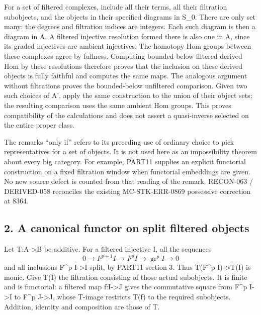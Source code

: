 \documentclass[11pt]{article}
\begin{document}
For a set of filtered complexes,\allowbreak{} include all their terms,\allowbreak{} all their filtration subobjects,\allowbreak{} and the objects in their specified diagrams in S\_\allowbreak{}0. There are only set many:\allowbreak{} the degrees and filtration indices are integers. Each such diagram is then a diagram in A\textquotesingle. A filtered injective resolution formed there is also one in A,\allowbreak{} since its graded injectives are ambient injectives. The homotopy Hom groups between these complexes agree by fullness. Computing bounded-below filtered derived Hom by these resolutions therefore proves that the inclusion on these derived objects is fully faithful and computes the same maps. The analogous argument without filtrations proves the bounded-below unfiltered comparison. Given two such choices of A',\allowbreak{} apply the same construction to the union of their object sets; the resulting comparison uses the same ambient Hom groups. This proves compatibility of the calculations and does not assert a quasi-inverse selected on the entire proper class.

The remark\textquotesingle s ``only if'' refers to its preceding use of ordinary choice to pick representatives for a set of objects. It is not used here as an impossibility theorem about every big category. For example,\allowbreak{} PART11 supplies an explicit functorial construction on a fixed filtration window when functorial embeddings are given. No new source defect is counted from that reading of the remark. RECON-063 /\allowbreak{} DERIVED-058 reconciles the existing MC-STK-ERR-0869 possessive correction at 8364.

\subsection{2. A canonical functor on split filtered objects}\label{proofs-8352-8772-a-canonical-functor-on-split-filtered-objects}

Let T:\allowbreak{}A\allowbreak{}->B be additive. For a filtered injective I,\allowbreak{} all the sequences \[
 0\to F^{p+1}I\longrightarrow F^p I
      \longrightarrow \operatorname{gr}^p I\to0              \tag{2.1}
\] and all inclusions F\^{}p I\allowbreak{}->I split,\allowbreak{} by PART11 section 3. Thus T(F\^{}p I)\allowbreak{}\allowbreak{}->T(I)\allowbreak{} is monic. Give T(I)\allowbreak{} the filtration consisting of those actual subobjects. It is finite and is functorial:\allowbreak{} a filtered map f:\allowbreak{}I\allowbreak{}->J gives the commutative square from F\^{}p I\allowbreak{}->I to F\^{}p J\allowbreak{}->J,\allowbreak{} whose T-image restricts T(f)\allowbreak{} to the required subobjects. Addition,\allowbreak{} identity and composition are those of T.
\end{document}
